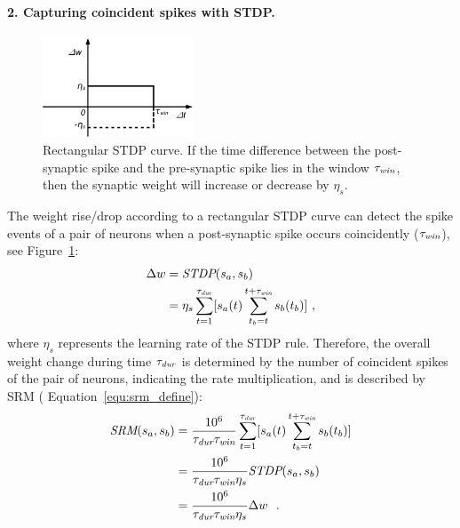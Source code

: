 \paragraph{2. Capturing coincident spikes with STDP.\\}
\begin{figure}
	\centering
	\includegraphics[width=0.4\textwidth]{pics_sdlm/stdp.pdf}
	\caption{Rectangular STDP curve.
		If the time difference between the post-synaptic spike and the pre-synaptic spike lies in the window $\tau_{\textit{\textrm{win}}}$, then the synaptic weight will increase or decrease by $\eta_s$.}
	\label{fig:rtg_stdp}
\end{figure}
The weight rise/drop according to a rectangular STDP curve can detect the spike events of a pair of neurons when a post-synaptic spike occurs coincidently (\DIFdelbegin {}\DIFdelend \DIFaddbegin {}\DIFaddend $\tau_{\textit{\textrm{win}}}$), see Figure~\ref{fig:rtg_stdp}:
\begin{equation}
\begin{aligned}
\Delta w &= \textit{\textrm{STDP}}(s_a, s_b)\\
&= \eta_s \sum_{t=1}^{\tau_{\textit{\textrm{dur}}}} [s_a(t) \sum_{t_b=t}^{t+\tau_{\textit{\textrm{win}}}} s_b(t_b)]~,
\end{aligned}
\end{equation}
where $ \eta_s$ represents the learning rate of the STDP rule.
Therefore, the overall weight change during time $\tau_{\textit{\textrm{dur}}}$ is determined by the number of coincident spikes of the pair of neurons, indicating the rate multiplication, and is described by SRM ( Equation~\ref{equ:srm_define}):
\begin{equation}
\begin{aligned}
\textit{\textrm{SRM}}(s_a, s_b) %
&= \frac{10^6}{\tau_{\textit{\textrm{dur}}} \tau_{\textit{\textrm{win}}}} \sum_{t=1}^{\tau_{\textit{\textrm{dur}}}} [s_a(t) \sum_{t_b=t}^{t+\tau_{\textit{\textrm{win}}}} s_b(t_b)]\\
&= \frac{10^6}{\tau_{\textit{\textrm{dur}}}
\tau_{\textit{\textrm{win}}}
\eta_s}
\textit{\textrm{STDP}}(s_a, s_b)\\  %
&= \frac{10^6}{\tau_{\textit{\textrm{dur}}}
\tau_{\textit{\textrm{win}}}
\eta_s}
\Delta w~~.
\end{aligned}
\end{equation}
